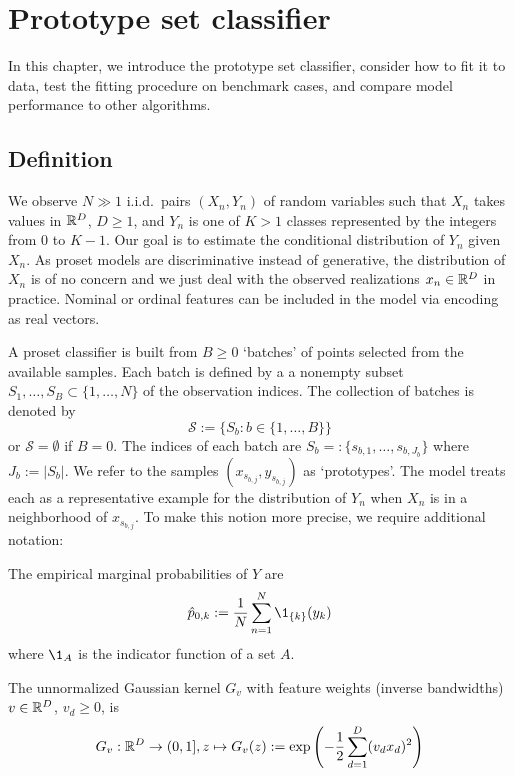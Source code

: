 \chapter{Prototype set classifier}
\label{ch_classifier}
%
In this chapter, we introduce the prototype set classifier, consider how to fit it to data, test the fitting procedure on benchmark cases, and compare model performance to other algorithms.
%
\section{Definition}
\label{sec_classifier_definition}
%
We observe $N\gg1$ i.i.d.\ pairs $(X_n,Y_n)$ of random variables such that $X_n$ takes values in $\mathbb{R}^D$, $D\geq1$, and $Y_n$ is one of $K>1$ classes represented by the integers from 0 to $K-1$.
Our goal is to estimate the conditional distribution of $Y_n$ given $X_n$.
As proset models are discriminative instead of generative, the distribution of $X_n$ is of no concern and we just deal with the observed realizations $x_n\in\mathbb{R}^D$ in practice.
Nominal or ordinal features can be included in the model via encoding as real vectors.\par
%
A proset classifier is built from $B\geq0$ `batches' of points selected from the available samples.
Each batch is defined by a a nonempty subset $S_1,\dots,S_B\subset\{1,\dots,N\}$ of the observation indices.
The collection of batches is denoted by
%
\begin{equation}
\mathcal{S}:=\{S_b:b\in\{1,\dots,B\}\}\label{eq_batches}
\end{equation}
%
or $\mathcal{S}=\emptyset$ if $B=0$.
The indices of each batch are $S_b=:\{s_{b,1},\dots,s_{b,J_b}\}$ where $J_b:=|S_b|$.
We refer to the samples $(x_{s_{b,j}},y_{s_{b,j}})$ as `prototypes'.
The model treats each as a representative example for the distribution of $Y_n$ when $X_n$ is in a neighborhood of $x_{s_{b,j}}$.
To make this notion more precise, we require additional notation:\par
%
The empirical marginal probabilities of $Y$ are
%
\begin{equation}
\hat{p}_{0,k}:=\frac{1}{N}\sum_{n=1}^N\1_{\{k\}}(y_k)\label{eq_p0k}
\end{equation}
%
where $\1_A$ is the indicator function of a set $A$.\par
%
The unnormalized Gaussian kernel $G_v$ with feature weights (inverse bandwidths) $v\in\mathbb{R}^D$, $v_d\geq0$, is
%
\begin{equation}
G_v:\mathbb{R}^D\rightarrow(0,1],
z\mapsto G_v(z):=\exp\left(-\frac{1}{2}\sum_{d=1}^D(v_dx_d)^2\right)\label{eq_kernel}
\end{equation}
